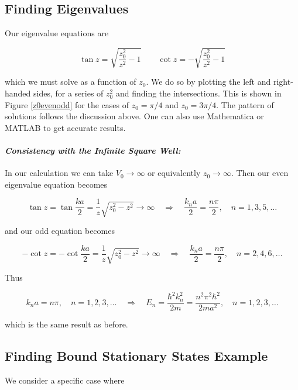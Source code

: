 \subsection{Finding Eigenvalues} Our eigenvalue equations are 

\[
\tan z = \sqrt{\frac{z_0^2}{z^2} - 1} \qquad \cot z = -\sqrt{\frac{z_0^2}{z^2}
- 1}
\] \vspace{3px}


which we must solve as a function of $z_0$. We do so by plotting the left and
right-handed sides, for a series of $z_0^2$ and finding the intersections. This
is shown in Figure \ref{z0evenodd} for the cases of $z_0 = \pi /4$ and $z_0
= 3\pi / 4$. The
pattern of solutions follows the discussion above. One can also use Mathematica
or MATLAB to get accurate results. 

\paragraph{\textit{Consistency with the Infinite Square Well:}}  In our calculation we can take $V_0 \rightarrow \infty$ or equivalently $z_0
\rightarrow \infty$. Then our even eigenvalue equation becomes

\[
\tan z = \tan \frac{ka}{2} = \frac{1}{z} \sqrt{z_0^2 - z^2} \rightarrow \infty
\quad \Rightarrow \quad \frac{k_n a}{2} = \frac{n\pi}{2}, \quad n = 1, 3, 5,
\hdots
\] \vspace{3px}


and our odd equation becomes 

\[
-\cot z = -\cot \frac{ka}{2} = \frac{1}{z} \sqrt{z_0^2 - z^2} \rightarrow
\infty \quad \Rightarrow \quad \frac{k_n a}{2} = \frac{n\pi}{2}, \quad n = 2,
4, 6,\hdots
\] \vspace{3px}

Thus

\[
k_n a = n\pi, \quad n = 1,2,3,\hdots \quad \Rightarrow \quad E_n
= \frac{\hbar^2k_n^2}{2m} = \frac{n^2\pi^2\hbar^2}{2ma^2}, \quad
n = 1,2,3,\hdots
\] \vspace{3px}

which is the same result as before. 




\subsection{Finding Bound Stationary States Example}

We consider a specific case where 

